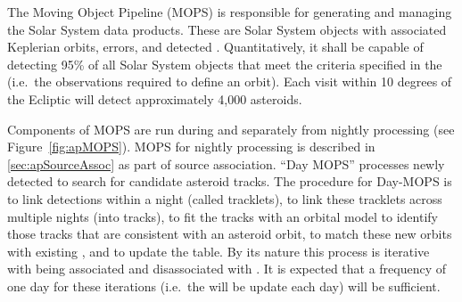 The Moving Object Pipeline (MOPS) is responsible for generating and managing the Solar System data products. These are Solar System objects with associated Keplerian orbits, errors, and detected \DIASources. Quantitatively, it shall be capable of detecting 95\% of all Solar System objects that meet the criteria specified in the \OSS\@ (i.e.\ the observations required to define an orbit). Each visit within 10 degrees of the Ecliptic will detect approximately 4,000 asteroids.

Components of MOPS are run during and separately from nightly processing (see Figure~\ref{fig:apMOPS}). MOPS for nightly processing is described in \ref{sec:apSourceAssoc} as part of source association. ``Day MOPS'' processes newly detected \DIAObjects to search for candidate asteroid tracks. The procedure for Day-MOPS is to link \DIASource detections within a night (called tracklets), to link these tracklets across multiple nights (into tracks), to fit the tracks with an orbital model to identify those tracks that are consistent with an asteroid orbit, to match these new orbits with existing \SSObjects, and to update the \SSObject table. By its nature this process is iterative with \DIASources being associated and disassociated with \SSObjects. It is expected that a frequency of one day for these iterations (i.e.\ the \SSObjects will be update each day) will be sufficient.

